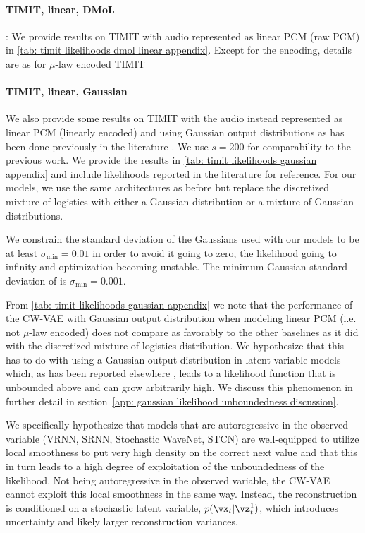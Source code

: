 {\paragraph{TIMIT, linear, DMoL}: We provide results on TIMIT with audio represented as linear PCM (raw PCM) in \cref{tab: timit likelihoods dmol linear appendix}. Except for the encoding, details are as for $\mu$-law encoded TIMIT

\paragraph{TIMIT, linear, Gaussian} We also provide some results on TIMIT with the audio instead represented as linear PCM (linearly encoded) and using Gaussian output distributions as has been done previously in the literature \cite{chung_recurrent_2015, fraccaro_sequential_2016, lai_stochastic_2018, aksan_stcn_2019}. We use $s=200$ for comparability to the previous work. We provide the results in \cref{tab: timit likelihoods gaussian appendix} and include likelihoods reported in the literature for reference. For our models, we use the same architectures as before but replace the discretized mixture of logistics with either a Gaussian distribution or a mixture of Gaussian distributions. 

We constrain the standard deviation of the Gaussians used with our models to be at least $\sigma_\text{min} = 0.01$ in order to avoid it going to zero, the likelihood going to infinity and optimization becoming unstable. The minimum Gaussian standard deviation of \citet{aksan_stcn_2019} is $\sigma_\text{min} = 0.001$.

From \cref{tab: timit likelihoods gaussian appendix} we note that the performance of the CW-VAE with Gaussian output distribution when modeling linear PCM (i.e. not $\mu$-law encoded) does not compare as favorably to the other baselines as it did with the discretized mixture of logistics distribution. We hypothesize that this has to do with using a Gaussian output distribution in latent variable models which, as has been reported elsewhere \cite{mattei_leveraging_2018}, leads to a likelihood function that is unbounded above and can grow arbitrarily high. We discuss this phenomenon in further detail in section~\cref{app: gaussian likelihood unboundedness discussion}. 

We specifically hypothesize that models that are autoregressive in the observed variable (VRNN, SRNN, Stochastic WaveNet, STCN) are well-equipped to utilize local smoothness to put very high density on the correct next value and that this in turn leads to a high degree of exploitation of the unboundedness of the likelihood. Not being autoregressive in the observed variable, the CW-VAE cannot exploit this local smoothness in the same way. Instead, the reconstruction is conditioned on a stochastic latent variable, $p(\vx_t|\vz^1_t)$, which introduces uncertainty and likely larger reconstruction variances.


}
